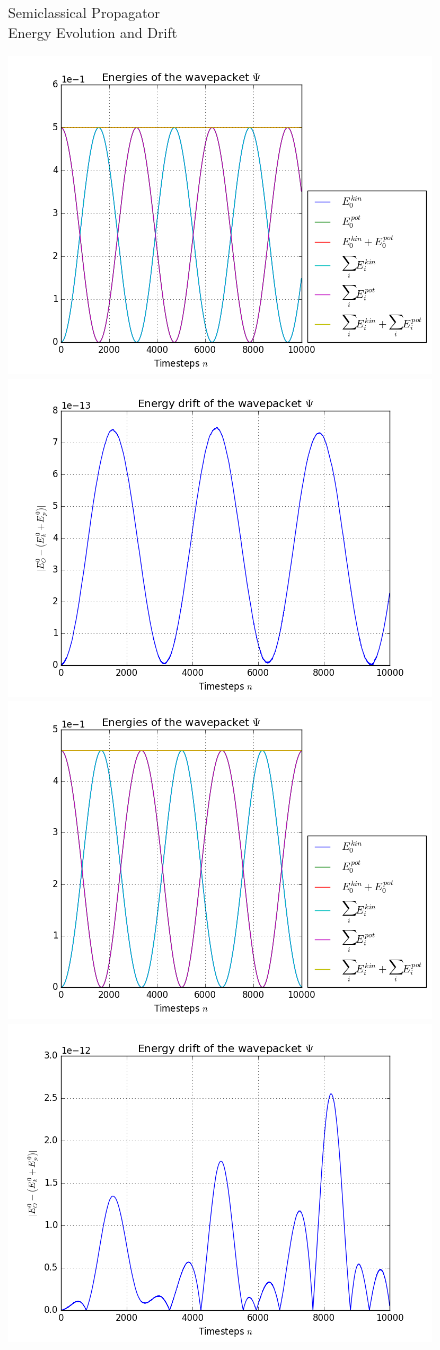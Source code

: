 \begin{figure}[ht]
	\centering
	\begin{minipage}[c]{\textwidth}
		\begin{center}
			\large Semiclassical Propagator \\[1mm]
			\normalsize Energy Evolution and Drift
			\vspace{4mm}
		\end{center}
	\end{minipage}
	\includegraphics[width=.45\textwidth]{figures/harmonic_1D_Semiclassical_energies.png}
	\includegraphics[width=.45\textwidth]{figures/harmonic_1D_Semiclassical_drift.png} \\
	\includegraphics[width=.45\textwidth]{figures/torsional_1D_Semiclassical_energies.png}
	\includegraphics[width=.45\textwidth]{figures/torsional_1D_Semiclassical_drift.png} \\

\end{figure}

